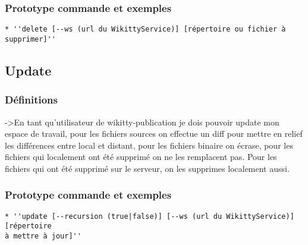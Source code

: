 \documentclass{article}
\begin{document}
\subsubsection{Prototype commande et exemples}

\begin{verbatim}
* ''delete [--ws (url du WikittyService)] [répertoire ou fichier à supprimer]''
\end{verbatim}




\subsection{Update}
\subsubsection{Définitions}

->En tant qu'utilisateur de wikitty-publication je dois pouvoir update mon espace de travail,
pour les fichiers sources on effectue un diff pour mettre en relief les différences entre local 
et distant, pour les fichiers binaire on écrase, pour les fichiers qui localement ont été supprimé
on ne les remplacent pas. Pour les fichiers qui ont été supprimé sur le serveur, on les supprimes localement 
aussi.

\subsubsection{Prototype commande et exemples}

\begin{verbatim}
* ''update [--recursion (true|false)] [--ws (url du WikittyService)] [répertoire
à mettre à jour]''
\end{verbatim}
\end{document}
